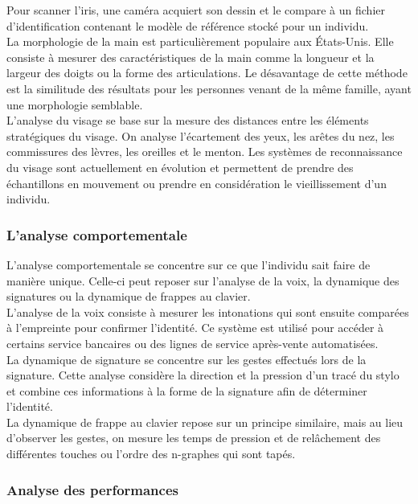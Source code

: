 Pour scanner l'iris, une caméra acquiert son dessin et le compare à un fichier d'identification contenant le modèle de référence stocké pour un individu.\\

La morphologie de la main est particulièrement populaire aux États-Unis. Elle consiste à mesurer des caractéristiques de la main comme la longueur et la largeur des doigts ou la forme des articulations. Le désavantage de cette méthode est la similitude des résultats pour les personnes venant de la même famille, ayant une morphologie semblable.\\

L'analyse du visage se base sur la mesure des distances entre les éléments stratégiques du visage. On analyse l'écartement des yeux,  les arêtes du nez, les commissures des lèvres, les oreilles et le menton. Les systèmes de reconnaissance du visage sont actuellement en évolution et permettent de prendre des échantillons en mouvement ou prendre en considération le vieillissement d'un individu.

\subsubsection{L'analyse comportementale}

L'analyse comportementale se concentre sur ce que l'individu sait faire de manière unique. Celle-ci peut reposer sur l'analyse de la voix, la dynamique des signatures ou la dynamique de frappes au clavier.\\

L'analyse de la voix consiste à mesurer les intonations qui sont ensuite comparées à l'empreinte pour confirmer l'identité. Ce système est utilisé pour accéder à certains service bancaires ou des lignes de service après-vente automatisées.\\

La dynamique de signature se concentre sur les gestes effectués lors de la signature. Cette analyse considère la direction et la pression d'un tracé du stylo et combine ces informations à la forme de la signature afin de déterminer l'identité.\\

La dynamique de frappe au clavier repose sur un principe similaire, mais au lieu d'observer les gestes, on mesure les temps de pression et de relâchement des différentes touches\cite{giotGREYC} ou l'ordre des n-graphes qui sont tapés\cite{bergadano2002,gunetti2005}.

\subsubsection{Analyse des performances}

